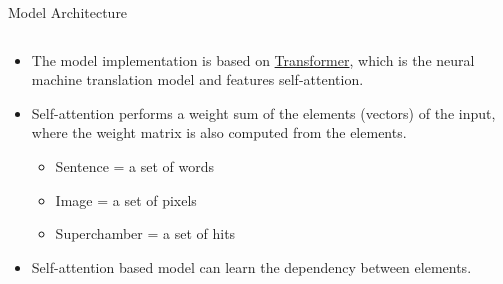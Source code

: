 \documentclass[10pt]{beamer}
\begin{document}
\begin{frame}[fragile]{Model Architecture}

\begin{columns}
    \begin{column}{0.6\textwidth}
    \begin{itemize}
        \item The model implementation is based on \href{https://arxiv.org/abs/1706.03762}{Transformer}, which is the neural machine translation model and features self-attention.
        \item Self-attention performs a weight sum of the elements (vectors) of the input, where the weight matrix is also computed from the elements.
        \begin{itemize}
            \item Sentence = a set of words
            \item Image = a set of pixels
            \item Superchamber = a set of hits
        \end{itemize}
        \item Self-attention based model can learn the dependency between elements.
    \end{itemize}
    
    \end{column}


\end{columns}
\end{frame}
\end{document}
